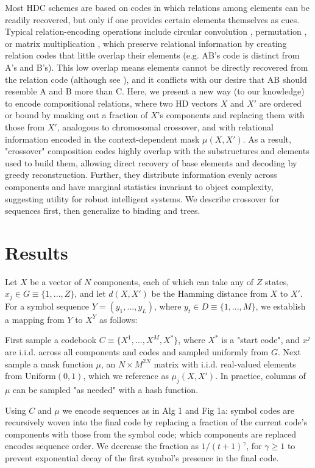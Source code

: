 \documentclass{article}
\begin{document}
Most HDC schemes are based on codes in which relations among elements can be readily recovered, but only if one provides certain elements themselves as cues. Typical relation-encoding operations include circular convolution \cite{Plate}, permutation \cite{Sahlgren, Gayler}, or matrix multiplication \cite{Gosmann}, which preserve relational information by creating relation codes that little overlap their elements (e.g. AB's code is distinct from A's and B's). This low overlap means elements cannot be directly recovered from the relation code (although see \cite{Rachkovskij:2001}), and it conflicts with our desire that AB should resemble A and B more than C. Here, we present a new way (to our knowledge) to encode compositional relations, where two HD vectors $X$ and $X'$ are ordered or bound by masking out a fraction of $X$'s components and replacing them with those from $X'$, analogous to chromosomal crossover, and with relational information encoded in the context-dependent mask $\mu(X, X')$. As a result, "crossover" composition codes highly overlap with the substructures and elements used to build them, allowing direct recovery of base elements and decoding by greedy reconstruction. Further, they distribute information evenly across components and have marginal statistics invariant to object complexity, suggesting utility for robust intelligent systems. We describe crossover for sequences first, then generalize to binding and trees.

\section{Results}

Let $X$ be a vector of $N$ components, each of which can take any of $Z$ states, $x_j \in G \equiv \{1,...,Z\}$, and let $d(X, X')$ be the Hamming distance from $X$ to $X'$. For a symbol sequence $Y = (y_1, ..., y_L)$, where $y_t \in D \equiv \{1, ..., M\}$, we establish a mapping from $Y$ to $X^Y$ as follows:

First sample a codebook $C \equiv \{X^1, ..., X^M, X^*\}$, where $X^*$ is a "start code", and $x^j$ are i.i.d. across all components and codes and sampled uniformly from $G$. Next sample a mask function $\mu$, an $N \times M^{2N}$ matrix with i.i.d. real-valued elements from $\textrm{Uniform}(0, 1)$, which we reference as $\mu_j(X, X')$. In practice, columns of $\mu$ can be sampled "as needed" with a hash function.

Using $C$ and $\mu$ we encode sequences as in Alg 1 and Fig 1a: symbol codes are recursively woven into the final code by replacing a fraction of the current code's components with those from the symbol code; which components are replaced encodes sequence order. We decrease the fraction as $1/(t+1)^\gamma$, for $\gamma \geq 1$ to prevent exponential decay of the first symbol's presence in the final code.
\end{document}
